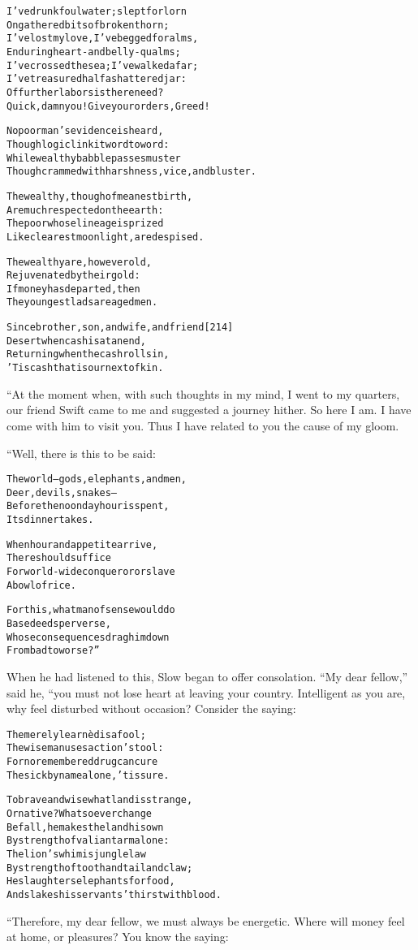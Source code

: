 \documentclass{article}
\renewenvironment{verbatim}{\begin{alltt}\normalfont\begin{centering}}{\end{centering}\end{alltt}}
\begin{document}
\begin{verbatim}
I've drunk foul water; slept forlorn
On gathered bits of broken thorn;
I've lost my love, I've begged for alms,
Enduring heart- and belly-qualms;
I've crossed the sea; I've walked afar;
I've treasured half a shattered jar:
Of further labors is there need?
Quick, damn you! Give your orders, Greed!

No poor man's evidence is heard,
Though logic link it word to word:
While wealthy babble passes muster
Though crammed with harshness, vice, and bluster.

The wealthy, though of meanest birth,
Are much respected on the earth:
The poor whose lineage is prized
Like clearest moonlight, are despised.

The wealthy are, however old,
Rejuvenated by their gold:
If money has departed, then
The youngest lads are aged men.

Since brother, son, and wife, and friend                [214]
Desert when cash is at an end,
Returning when the cash rolls in,
'Tis cash that is our next of kin.
\end{verbatim}
“At the moment when, with such thoughts in my mind, I went to my
quarters, our friend Swift came to me and suggested a journey
hither. So here I am. I have come with him to visit you. Thus I
have related to you the cause of my gloom.

“Well, there is this to be said:

\begin{verbatim}
The world--gods, elephants, and men,
    Deer, devils, snakes--
Before the noonday hour is spent,
    Its dinner takes.

When hour and appetite arrive,
    There should suffice
For world-wide conqueror or slave
    A bowl of rice.

For this, what man of sense would do
    Base deeds perverse,
Whose consequences drag him down
    From bad to worse?”
\end{verbatim}
When he had listened to this, Slow began to offer consolation.
``My dear fellow,'' said he, “you must not lose heart at leaving
your country. Intelligent as you are, why feel disturbed without
occasion? Consider the saying:

\begin{verbatim}
The merely learnèd is a fool;
The wise man uses action's tool:
For no remembered drug can cure
The sick by name alone, 'tis sure.

To brave and wise what land is strange,
Or native? Whatsoever change
Befall, he makes the land his own
By strength of valiant arm alone:
The lion's whim is jungle law
By strength of tooth and tail and claw;
He slaughters elephants for food,
And slakes his servants' thirst with blood.
\end{verbatim}
“Therefore, my dear fellow, we must always be energetic. Where will
money feel at home, or pleasures? You know the saying:
\end{document}
